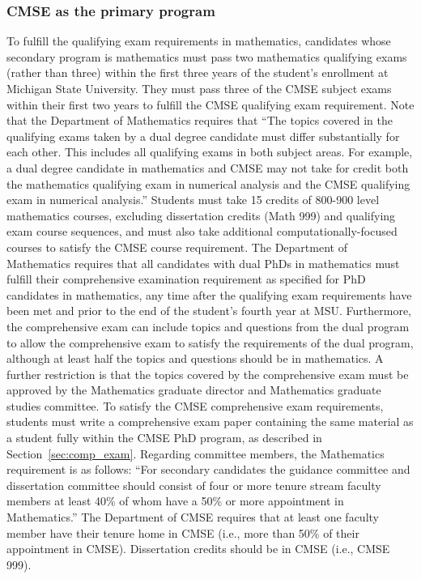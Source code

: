 \subsubsection{CMSE as the primary program}

To fulfill the qualifying exam requirements in mathematics, candidates
whose secondary program is mathematics must pass two mathematics
qualifying exams (rather than three) within the first three years of
the student’s enrollment at Michigan State University.  They must pass
three of the CMSE subject exams within their first two years to
fulfill the CMSE qualifying exam requirement.  Note that the
Department of Mathematics requires that ``The topics covered in the
qualifying exams taken by a dual degree candidate must differ
substantially for each other. This includes all qualifying exams in
both subject areas. For example, a dual degree candidate in
mathematics and CMSE may not take for credit both the mathematics
qualifying exam in numerical analysis and the CMSE qualifying exam in
numerical analysis.''  Students must take 15 credits of 800-900 level
mathematics courses, excluding dissertation credits (Math 999) and
qualifying exam course sequences, and must also take additional
computationally-focused courses to satisfy the CMSE course
requirement.  The Department of Mathematics requires that all
candidates with dual PhDs in mathematics must fulfill their
comprehensive examination requirement as specified for PhD candidates
in mathematics, any time after the qualifying exam requirements have
been met and prior to the end of the student's fourth year at MSU.
Furthermore, the comprehensive exam can include topics and questions
from the dual program to allow the comprehensive exam to satisfy the
requirements of the dual program, although at least half the topics
and questions should be in mathematics.  A further restriction is that
the topics covered by the comprehensive exam must be approved by the
Mathematics graduate director and Mathematics graduate studies
committee.  To satisfy the CMSE comprehensive exam requirements,
students must write a comprehensive exam paper containing the same
material as a student fully within the CMSE PhD program, as described
in Section~\ref{sec:comp_exam}.  Regarding committee members, the
Mathematics requirement is as follows: ``For secondary candidates the
guidance committee and dissertation committee should consist of four
or more tenure stream faculty members at least 40\% of whom have a
50\% or more appointment in Mathematics.''  The Department of CMSE
requires that at least one faculty member have their tenure home in
CMSE (i.e., more than 50\% of their appointment in CMSE).
Dissertation credits should be in CMSE (i.e., CMSE 999).

